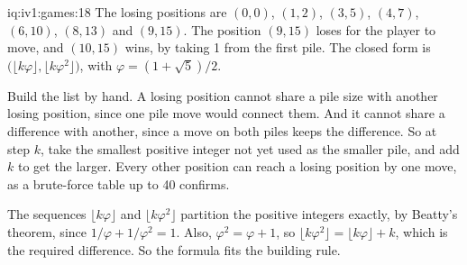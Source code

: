 \begin{solution}{iq:iv1:games:18}
The losing positions are $(0, 0)$, $(1, 2)$, $(3, 5)$, $(4, 7)$, $(6, 10)$, $(8, 13)$ and $(9, 15)$. The position $(9, 15)$ loses for the player to move, and $(10, 15)$ wins, by taking 1 from the first pile. The closed form is $\bigl(\lfloor k\varphi \rfloor, \lfloor k\varphi^2 \rfloor\bigr)$, with $\varphi = (1 + \sqrt{5})/2$.

Build the list by hand. A losing position cannot share a pile size with another losing position, since one pile move would connect them. And it cannot share a difference with another, since a move on both piles keeps the difference. So at step $k$, take the smallest positive integer not yet used as the smaller pile, and add $k$ to get the larger. Every other position can reach a losing position by one move, as a brute-force table up to 40 confirms.

The sequences $\lfloor k\varphi \rfloor$ and $\lfloor k\varphi^2 \rfloor$ partition the positive integers exactly, by Beatty's theorem, since $1/\varphi + 1/\varphi^2 = 1$. Also, $\varphi^2 = \varphi + 1$, so $\lfloor k\varphi^2 \rfloor = \lfloor k\varphi \rfloor + k$, which is the required difference. So the formula fits the building rule.

\end{solution}

